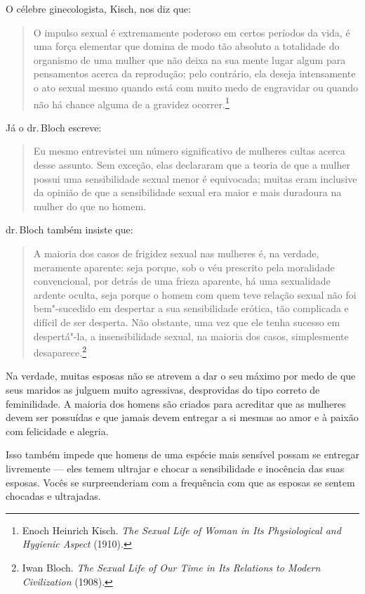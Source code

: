 O célebre ginecologista, Kisch, nos diz que:

\begin{quote}
O impulso sexual é extremamente poderoso em certos períodos da vida, é
uma força elementar que domina de modo tão absoluto a totalidade do
organismo de uma mulher que não deixa na sua mente lugar algum para
pensamentos acerca da reprodução; pelo contrário, ela deseja
intensamente o ato sexual mesmo quando está com muito medo de engravidar
ou quando não há chance alguma de a gravidez ocorrer.\footnote{Enoch
  Heinrich Kisch. \emph{The Sexual Life of Woman in Its Physiological
  and Hygienic Aspect} (1910).}
\end{quote}  

Já o dr.\,Bloch escreve:

\begin{quote}
Eu mesmo entrevistei um número significativo de mulheres cultas acerca
desse assunto. Sem exceção, elas declararam que a teoria de que a mulher
possui uma sensibilidade sexual menor é equivocada; muitas eram
inclusive da opinião de que a sensibilidade sexual era maior e mais
duradoura na mulher do que no homem.
\end{quote}

dr.\,Bloch também insiste que: 

\begin{quote}
A maioria dos casos de frigidez sexual
nas mulheres é, na verdade, meramente aparente: seja porque, sob o véu
prescrito pela moralidade convencional, por detrás de uma frieza
aparente, há uma sexualidade ardente oculta, seja porque o homem com
quem teve relação sexual não foi bem"-sucedido em despertar a sua
sensibilidade erótica, tão complicada e difícil de ser desperta. Não
obstante, uma vez que ele tenha sucesso em despertá"-la, a
insensibilidade sexual, na maioria dos casos, simplesmente
desaparece.\footnote{Iwan Bloch. \emph{The Sexual Life of Our Time
  in Its Relations to Modern Civilization} (1908).}
\end{quote}

Na verdade, muitas esposas não se atrevem a dar o seu máximo por medo de
que seus maridos as julguem muito agressivas, desprovidas do tipo
correto de feminilidade. A maioria dos homens são criados para acreditar
que as mulheres devem ser possuídas e que jamais devem entregar a si
mesmas ao amor e à paixão com felicidade e alegria.

Isso também impede que homens de uma espécie mais sensível possam se
entregar livremente --- eles temem ultrajar e chocar a sensibilidade e
inocência das suas esposas. Vocês se surpreenderiam com a frequência com que
as esposas se sentem chocadas e ultrajadas.

